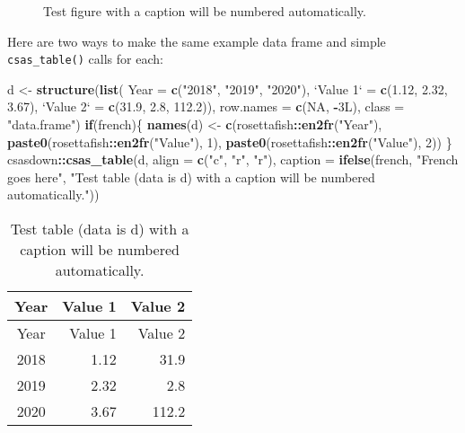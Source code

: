 \documentclass[12pt]{article}\usepackage[]{graphicx}\usepackage[]{color}
\newenvironment{Shaded}{}{}
\newcommand{\KeywordTok}[1]{\textcolor[rgb]{0.00,0.44,0.13}{\textbf{{#1}}}}
\newcommand{\DataTypeTok}[1]{\textcolor[rgb]{0.56,0.13,0.00}{{#1}}}
\newcommand{\DecValTok}[1]{\textcolor[rgb]{0.25,0.63,0.44}{{#1}}}
\newcommand{\FloatTok}[1]{\textcolor[rgb]{0.25,0.63,0.44}{{#1}}}
\newcommand{\StringTok}[1]{\textcolor[rgb]{0.25,0.44,0.63}{{#1}}}
\newcommand{\OtherTok}[1]{\textcolor[rgb]{0.00,0.44,0.13}{{#1}}}
\newcommand{\NormalTok}[1]{{#1}}
\newcommand{\OperatorTok}[1]{\textcolor[rgb]{0.00,0.44,0.13}{\textbf{{#1}}}}
\newcommand{\ControlFlowTok}[1]{\textcolor[rgb]{0.00,0.44,0.13}{\textbf{{#1}}}}
\begin{document}
\begin{figure}[H]

{\centering {} 

}

\caption{Test figure with a caption will be numbered automatically.}\label{fig:testfig}
\end{figure}
Here are two ways to make the same example data frame and simple \texttt{csas\_table()} calls for each:
\begin{Shaded}
\begin{Highlighting}[]
\NormalTok{d <-}\StringTok{ }\KeywordTok{structure}\NormalTok{(}\KeywordTok{list}\NormalTok{(}
  \DataTypeTok{Year =} \KeywordTok{c}\NormalTok{(}\StringTok{"2018"}\NormalTok{, }\StringTok{"2019"}\NormalTok{, }\StringTok{"2020"}\NormalTok{), }
  \StringTok{`}\DataTypeTok{Value 1}\StringTok{`}\NormalTok{ =}\StringTok{ }\KeywordTok{c}\NormalTok{(}\FloatTok{1.12}\NormalTok{, }\FloatTok{2.32}\NormalTok{, }\FloatTok{3.67}\NormalTok{), }
  \StringTok{`}\DataTypeTok{Value 2}\StringTok{`}\NormalTok{ =}\StringTok{ }\KeywordTok{c}\NormalTok{(}\FloatTok{31.9}\NormalTok{, }\FloatTok{2.8}\NormalTok{, }\FloatTok{112.2}\NormalTok{)), }
  \DataTypeTok{row.names =} \KeywordTok{c}\NormalTok{(}\OtherTok{NA}\NormalTok{, }\OperatorTok{-}\NormalTok{3L), }\DataTypeTok{class =} \StringTok{"data.frame"}\NormalTok{)}
\ControlFlowTok{if}\NormalTok{(french)\{}
  \KeywordTok{names}\NormalTok{(d) <-}\StringTok{ }\KeywordTok{c}\NormalTok{(rosettafish}\OperatorTok{::}\KeywordTok{en2fr}\NormalTok{(}\StringTok{"Year"}\NormalTok{),}
                 \KeywordTok{paste0}\NormalTok{(rosettafish}\OperatorTok{::}\KeywordTok{en2fr}\NormalTok{(}\StringTok{"Value"}\NormalTok{), }\DecValTok{1}\NormalTok{),}
                 \KeywordTok{paste0}\NormalTok{(rosettafish}\OperatorTok{::}\KeywordTok{en2fr}\NormalTok{(}\StringTok{"Value"}\NormalTok{), }\DecValTok{2}\NormalTok{))}
\NormalTok{\}}
\NormalTok{csasdown}\OperatorTok{::}\KeywordTok{csas_table}\NormalTok{(d,}
  \DataTypeTok{align =} \KeywordTok{c}\NormalTok{(}\StringTok{"c"}\NormalTok{, }\StringTok{"r"}\NormalTok{, }\StringTok{"r"}\NormalTok{),}
  \DataTypeTok{caption =} \KeywordTok{ifelse}\NormalTok{(french,}
                   \StringTok{"French goes here"}\NormalTok{,}
                   \StringTok{"Test table (data is d) with a caption will be numbered automatically."}\NormalTok{))}
\end{Highlighting}
\end{Shaded}
\begin{longtable}[]{@{}crr@{}}
\caption{\label{tab:testtab}Test table (data is d) with a caption will be numbered automatically.}\tabularnewline
\toprule
Year & Value 1 & Value 2\tabularnewline
\midrule
\endfirsthead
\toprule
Year & Value 1 & Value 2\tabularnewline
\midrule
\endhead
2018 & 1.12 & 31.9\tabularnewline
2019 & 2.32 & 2.8\tabularnewline
2020 & 3.67 & 112.2\tabularnewline
\bottomrule
\end{longtable}
\end{document}
